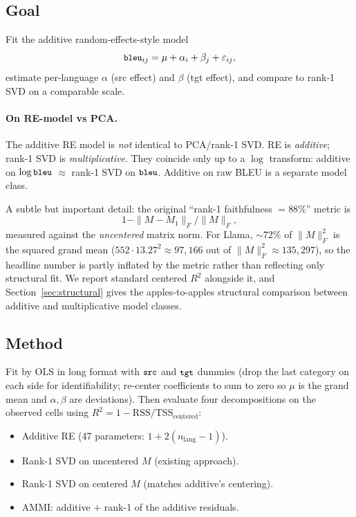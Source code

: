 \documentclass[11pt]{article}
\newcommand{\code}[1]{\texttt{\small #1}}
\begin{document}
\subsection{Goal}

Fit the additive random-effects-style model
\[
\code{bleu}_{ij} = \mu + \alpha_i + \beta_j + \varepsilon_{ij},
\]
estimate per-language $\alpha$ (src effect) and $\beta$ (tgt effect), and
compare to rank-1 SVD on a comparable scale.

\paragraph{On RE-model vs PCA.}

The additive RE model is \emph{not} identical to PCA/rank-1 SVD. RE is
\emph{additive}; rank-1 SVD is \emph{multiplicative}. They coincide only up
to a $\log$ transform: additive on $\log \code{bleu}$ $\approx$ rank-1 SVD on
$\code{bleu}$. Additive on raw BLEU is a separate model class.

A subtle but important detail: the original ``rank-1 faithfulness $= 88\%$''
metric is
\[
1 - \|M - M_1\|_F / \|M\|_F,
\]
measured against the \emph{uncentered} matrix norm. For Llama, $\sim 72\%$
of $\|M\|_F^2$ is the squared grand mean ($552 \cdot 13.27^2 \approx 97{,}166$
out of $\|M\|_F^2 \approx 135{,}297$), so the headline number is partly
inflated by the metric rather than reflecting only structural fit. We
report standard centered $R^2$ alongside it, and Section~\ref{sec:structural}
gives the apples-to-apples structural comparison between additive and
multiplicative model classes.

\subsection{Method}

Fit by OLS in long format with $\code{src}$ and $\code{tgt}$ dummies (drop
the last category on each side for identifiability; re-center coefficients
to sum to zero so $\mu$ is the grand mean and $\alpha, \beta$ are
deviations). Then evaluate four decompositions on the observed cells using
$R^2 = 1 - \mathrm{RSS}/\mathrm{TSS}_{\text{centered}}$:

\begin{itemize}
  \item Additive RE (47 parameters: $1 + 2(n_{\text{lang}}-1)$).
  \item Rank-1 SVD on uncentered $M$ (existing approach).
  \item Rank-1 SVD on centered $M$ (matches additive's centering).
  \item AMMI: additive $+$ rank-1 of the additive residuals.
\end{itemize}
\end{document}
